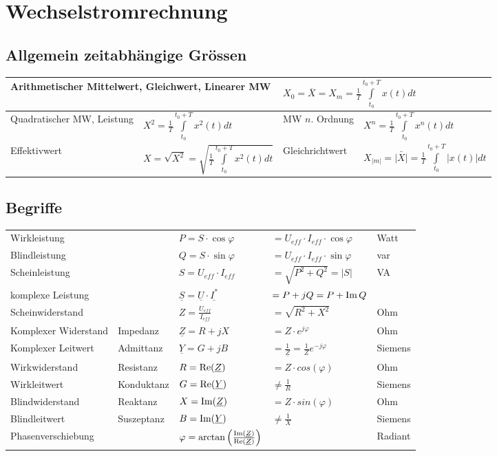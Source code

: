 \section{Wechselstromrechnung}
	\subsection{Allgemein zeitabhängige Grössen}
	\begin{tabular}{|ll|ll|}
    \hline
	\multicolumn{2}{|l}{Arithmetischer Mittelwert, Gleichwert, Linearer MW} 
	    	& \multicolumn{2}{l|}{$X_0 = \overline{X} = X_m = \frac {1} {T} \int\limits_{t_0}^{t_0+T}
	    	x(t)dt$} \\
	\hline
	Quadratischer MW, Leistung 
		& $X^2 = \frac {1} {T} \int\limits_{t_0}^{t_0+T} x^2(t)dt$ 
		& MW $n$. Ordnung
		& $X^n = \frac {1} {T} \int\limits_{t_0}^{t_0+T} x^n(t)dt$ \\
	\hline
	Effektivwert 
		& $X = \sqrt{X^2} = \sqrt{\frac{1}{T} \int\limits ^{t_0+T}_{t_0}{x^2(t)dt}}$
		& Gleichrichtwert 
		& $X_{|m|} = \bar{|X|} = \frac{1}{T} \int\limits_{t_0}^{t_0+T}{|x(t)| dt}$ \\
	\hline
   	\end{tabular}

	\subsection{Begriffe}
		\begin{tabular}{lllll}
		Wirkleistung & & $P = S \cdot \cos \varphi$ & $= U_{eff} \cdot I_{eff} \cdot
		\cos \varphi$ & Watt\\
		Blindleistung & & $Q = S \cdot \sin \varphi$ & $=U_{eff} \cdot I_{eff} \cdot
		\sin \varphi$ & var \\
		Scheinleistung & & $S = U_{eff} \cdot I_{eff}$  &
		$=\sqrt{P^2+Q^2}=\left|S\right|$ & VA\\
		komplexe Leistung & & $\underline{S}=\underline{U}\cdot\underline{I^*}$ &
		$=P+jQ=P+\operatorname{Im}{Q}$\\
		Scheinwiderstand & & $Z = \frac{U_{eff}}{I_{eff}} $ & $ =
		\sqrt{R^2+X^2}$ & Ohm\\ Komplexer Widerstand & Impedanz & $\underline Z = R + jX $ & $ = Z \cdot
		e^{j \varphi}$ & Ohm\\
		Komplexer Leitwert & Admittanz & $\underline Y = G + jB $ & $ =
		\frac{1}{\underline Z} = \frac{1}{Z}e^{-j\varphi}$ & Siemens\\
		Wirkwiderstand & Resistanz & $R = \operatorname{Re}(\underline Z) $ & $ = Z
		\cdot cos(\varphi)$ & Ohm\\
		Wirkleitwert & Konduktanz & $G = \operatorname{Re}(\underline Y) $ & $ \neq \frac{1}{R}$ &
		Siemens\\
		Blindwiderstand & Reaktanz & $X = \operatorname{Im}(\underline Z) $ & $ = Z
		\cdot sin(\varphi)$ & Ohm\\
		Blindleitwert & Suszeptanz & $B = \operatorname{Im}( \underline Y) $ & $ \neq \frac{1}{X}$
		& Siemens\\
		Phasenverschiebung & & $\varphi =
		\arctan\left(\frac{\operatorname{Im}(\underline{Z})}{\operatorname{Re}(\underline{Z})}\right)$ & &
		Radiant\\
		
		\end{tabular}
	
